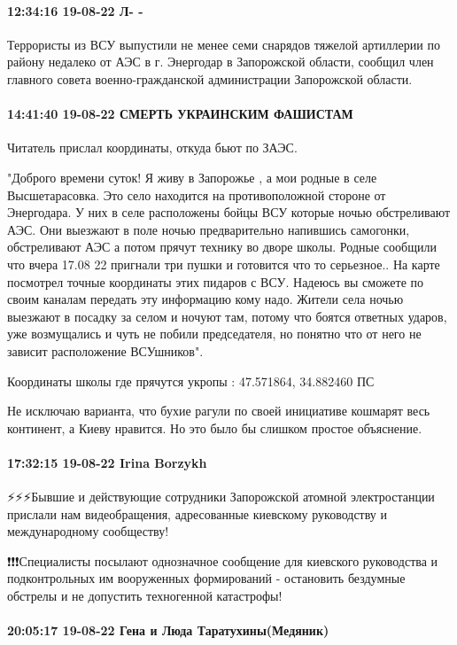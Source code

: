 \paragraph{12:34:16 19-08-22 Л- -}

Террористы из ВСУ выпустили не менее семи снарядов тяжелой артиллерии по району
недалеко от АЭС в г. Энергодар в Запорожской области, сообщил член главного
совета военно-гражданской администрации Запорожской области.

\paragraph{14:41:40 19-08-22 СМЕРТЬ УКРАИНСКИМ ФАШИСТАМ}

Читатель прислал координаты, откуда бьют по ЗАЭС.

"Доброго времени суток! Я живу в Запорожье , а мои родные в селе
Высшетарасовка. Это село находится на противоположной стороне от Энергодара. У
них в селе расположены бойцы ВСУ которые ночью обстреливают АЭС. Они выезжают в
поле ночью предварительно напившись самогонки, обстреливают АЭС а потом прячут
технику во дворе школы. Родные сообщили что вчера 17.08 22 пригнали три пушки и
готовится что то серьезное.. На карте посмотрел точные координаты этих пидаров
с ВСУ. Надеюсь вы сможете по своим каналам передать эту информацию кому надо.
Жители села ночью выезжают в посадку за селом и ночуют там, потому что боятся
ответных ударов, уже возмущались и чуть не побили председателя, но понятно что
от него не зависит расположение ВСУшников".

Координаты школы где прячутся укропы : 47.571864, 34.882460
ПС

Не исключаю варианта, что бухие рагули по своей инициативе кошмарят весь
континент, а Киеву нравится. Но это было бы слишком простое объяснение.

\paragraph{17:32:15 19-08-22 Irina Borzykh}

⚡️⚡️⚡️Бывшие и действующие сотрудники Запорожской атомной электростанции
прислали нам видеобращения, адресованные киевскому руководству и международному
сообществу!

❗️❗️❗️Специалисты посылают однозначное сообщение для киевского руководства и
подконтрольных им вооруженных формирований - остановить бездумные обстрелы и не
допустить техногенной катастрофы!

\paragraph{20:05:17 19-08-22 Гена и Люда Таратухины(Медяник)}

